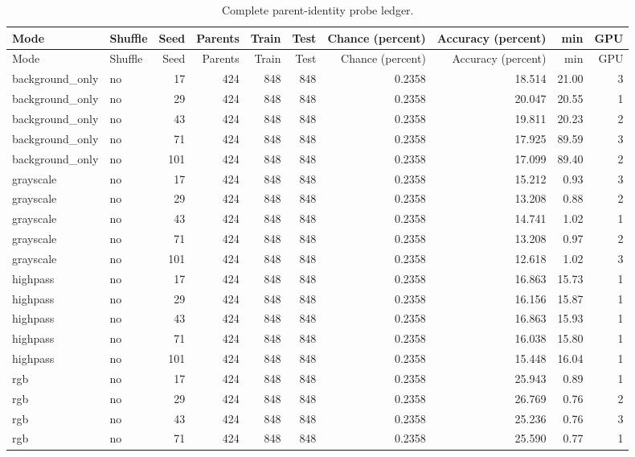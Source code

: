 \begin{longtable}{p{2.4cm}p{1.0cm}rrrrrrrr}
\caption{Complete parent-identity probe ledger.}\label{tab:all-probe-runs}\\
\toprule
Mode & Shuffle & Seed & Parents & Train & Test & Chance (percent) & Accuracy (percent) & min & GPU \\
\midrule
\endfirsthead
\toprule
Mode & Shuffle & Seed & Parents & Train & Test & Chance (percent) & Accuracy (percent) & min & GPU \\
\midrule
\endhead
\bottomrule
\endfoot
background\_only & no & 17 & 424 & 848 & 848 & 0.2358 & 18.514 & 21.00 & 3 \\ 
background\_only & no & 29 & 424 & 848 & 848 & 0.2358 & 20.047 & 20.55 & 1 \\ 
background\_only & no & 43 & 424 & 848 & 848 & 0.2358 & 19.811 & 20.23 & 2 \\ 
background\_only & no & 71 & 424 & 848 & 848 & 0.2358 & 17.925 & 89.59 & 3 \\ 
background\_only & no & 101 & 424 & 848 & 848 & 0.2358 & 17.099 & 89.40 & 2 \\ 
grayscale & no & 17 & 424 & 848 & 848 & 0.2358 & 15.212 & 0.93 & 3 \\ 
grayscale & no & 29 & 424 & 848 & 848 & 0.2358 & 13.208 & 0.88 & 2 \\ 
grayscale & no & 43 & 424 & 848 & 848 & 0.2358 & 14.741 & 1.02 & 1 \\ 
grayscale & no & 71 & 424 & 848 & 848 & 0.2358 & 13.208 & 0.97 & 2 \\ 
grayscale & no & 101 & 424 & 848 & 848 & 0.2358 & 12.618 & 1.02 & 3 \\ 
highpass & no & 17 & 424 & 848 & 848 & 0.2358 & 16.863 & 15.73 & 1 \\ 
highpass & no & 29 & 424 & 848 & 848 & 0.2358 & 16.156 & 15.87 & 1 \\ 
highpass & no & 43 & 424 & 848 & 848 & 0.2358 & 16.863 & 15.93 & 1 \\ 
highpass & no & 71 & 424 & 848 & 848 & 0.2358 & 16.038 & 15.80 & 1 \\ 
highpass & no & 101 & 424 & 848 & 848 & 0.2358 & 15.448 & 16.04 & 1 \\ 
rgb & no & 17 & 424 & 848 & 848 & 0.2358 & 25.943 & 0.89 & 1 \\ 
rgb & no & 29 & 424 & 848 & 848 & 0.2358 & 26.769 & 0.76 & 2 \\ 
rgb & no & 43 & 424 & 848 & 848 & 0.2358 & 25.236 & 0.76 & 3 \\ 
rgb & no & 71 & 424 & 848 & 848 & 0.2358 & 25.590 & 0.77 & 1 \\ 

\end{longtable}
